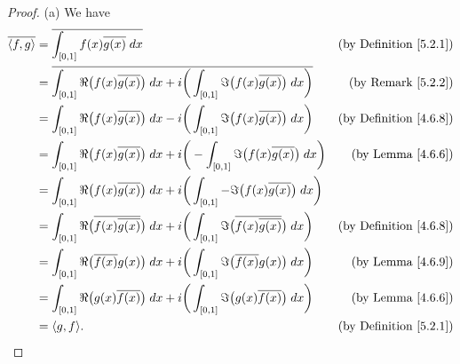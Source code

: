 \begin{proof}{(a)}
    We have
    \begin{align*}
        \overline{\inner*{f, g}} & = \overline{\int_{[0, 1]} f(x) \overline{g(x)} \; dx}                                                                                               & \text{(by Definition \ref{5.2.1})} \\
                                 & = \overline{\int_{[0, 1]} \Re\big(f(x) \overline{g(x)}\big) \; dx + i \bigg(\int_{[0, 1]} \Im\big(f(x) \overline{g(x)}\big) \; dx\bigg)}            & \text{(by Remark \ref{5.2.2})}     \\
                                 & = \int_{[0, 1]} \Re\big(f(x) \overline{g(x)}\big) \; dx - i \bigg(\int_{[0, 1]} \Im\big(f(x) \overline{g(x)}\big) \; dx\bigg)                       & \text{(by Definition \ref{4.6.8})} \\
                                 & = \int_{[0, 1]} \Re\big(f(x) \overline{g(x)}\big) \; dx + i \bigg(-\int_{[0, 1]} \Im\big(f(x) \overline{g(x)}\big) \; dx\bigg)                      & \text{(by Lemma \ref{4.6.6})}      \\
                                 & = \int_{[0, 1]} \Re\big(f(x) \overline{g(x)}\big) \; dx + i \bigg(\int_{[0, 1]} -\Im\big(f(x) \overline{g(x)}\big) \; dx\bigg)                                                           \\
                                 & = \int_{[0, 1]} \Re\big(\overline{f(x) \overline{g(x)}}\big) \; dx + i \bigg(\int_{[0, 1]} \Im\big(\overline{f(x) \overline{g(x)}}\big) \; dx\bigg) & \text{(by Definition \ref{4.6.8})} \\
                                 & = \int_{[0, 1]} \Re\big(\overline{f(x)} g(x)\big) \; dx + i \bigg(\int_{[0, 1]} \Im\big(\overline{f(x)} g(x)\big) \; dx\bigg)                       & \text{(by Lemma \ref{4.6.9})}      \\
                                 & = \int_{[0, 1]} \Re\big(g(x) \overline{f(x)}\big) \; dx + i \bigg(\int_{[0, 1]} \Im\big(g(x) \overline{f(x)}\big) \; dx\bigg)                       & \text{(by Lemma \ref{4.6.6})}      \\
                                 & = \inner*{g, f}.                                                                                                                                    & \text{(by Definition \ref{5.2.1})}
    \end{align*}
\end{proof}


